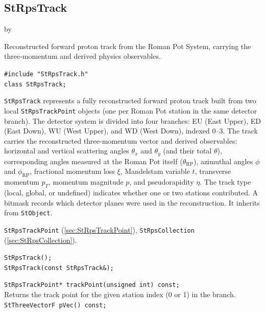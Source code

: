 \documentclass[twoside]{article}
\newcommand{\entrylabel}[1]{\mbox{\textbf{{#1}}}\hfil}%
\newenvironment{entry}
{\begin{list}{}%
    {\renewcommand{\makelabel}{\entrylabel}%
     \setlength{\labelwidth}{90pt}%
     \setlength{\leftmargin}{\labelwidth}
     \advance\leftmargin by \labelsep%
      }%
    }%
  {\end{list}}
\newcommand{\Entrylabel}[1]%
{\raisebox{0pt}[1ex][0pt]{\makebox[\labelwidth][l]%
    {\parbox[t]{\labelwidth}{\hspace{0pt}\textbf{{#1}}}}}}
\newenvironment{Entry}%
{\renewcommand{\entrylabel}{\Entrylabel}\begin{entry}}%
  {\end{entry}}
\begin{document}
\subsection{StRpsTrack}
\label{sec:StRpsTrack}
\begin{Entry}
\item[Summary] Reconstructed forward proton track from the Roman Pot System,
    carrying the three-momentum and derived physics observables.
\item[Synopsis]
    \verb+#include "StRpsTrack.h"+\\
    \verb+class StRpsTrack;+\\
\item[Description]
    \texttt{StRpsTrack} represents a fully reconstructed forward proton track
    built from two local \texttt{StRpsTrackPoint} objects (one per Roman Pot
    station in the same detector branch).  The detector system is divided into
    four branches: EU (East Upper), ED (East Down), WU (West Upper), and WD
    (West Down), indexed 0--3.  The track carries the reconstructed
    three-momentum vector and derived observables: horizontal and vertical
    scattering angles $\theta_x$ and $\theta_y$ (and their total $\theta$),
    corresponding angles measured at the Roman Pot itself ($\theta_\mathrm{RP}$),
    azimuthal angles $\phi$ and $\phi_\mathrm{RP}$, fractional momentum loss
    $\xi$, Mandelstam variable $t$, transverse momentum $p_T$, momentum
    magnitude $p$, and pseudorapidity $\eta$.  The track type (local, global,
    or undefined) indicates whether one or two stations contributed.
    A bitmask records which detector planes were used in the reconstruction.
    It inherits from \texttt{StObject}.
\item[Related Classes]
    \texttt{StRpsTrackPoint} (\ref{sec:StRpsTrackPoint}),
    \texttt{StRpsCollection} (\ref{sec:StRpsCollection}).
\item[Public\\ Constructors]
    \verb+StRpsTrack();+\\
    \verb+StRpsTrack(const StRpsTrack&);+\\
\item[Public Member\\ Functions]
    \verb+StRpsTrackPoint* trackPoint(unsigned int) const;+\\
    Returns the track point for the given station index (0 or 1) in the branch.\\
    \verb+StThreeVectorF pVec() const;+\\

\end{Entry}
\end{document}
